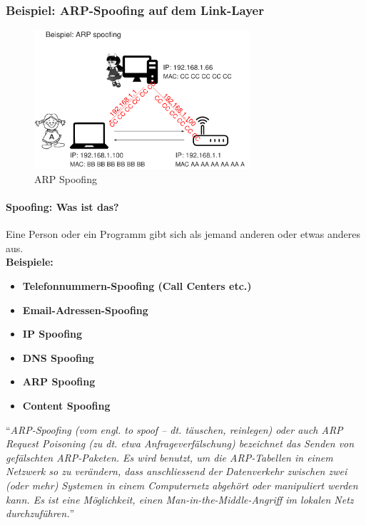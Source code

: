 \documentclass[10pt,a4paper]{article}
\begin{document}
\subsubsection*{Beispiel: ARP-Spoofing auf dem Link-Layer}
\begin{figure}[H]
    \begin{center}
    \includegraphics[width=8cm]{images/Beispiel_ARP_Spoofing.png}
    \caption{ARP Spoofing}
    \label{ARP Spoofing}
    \end{center}
\end{figure}

\paragraph*{Spoofing: Was ist das?}
Eine Person oder ein Programm gibt sich als jemand anderen oder etwas anderes aus.\\
\textbf{Beispiele:}
\begin{itemize}[noitemsep,topsep=0pt,leftmargin=*]
    \item \textbf{Telefonnummern-Spoofing (Call Centers etc.)}
    \item \textbf{Email-Adressen-Spoofing}
    \item \textbf{IP Spoofing}
    \item \textbf{DNS Spoofing}
    \item \textbf{ARP Spoofing}
    \item \textbf{Content Spoofing}
\end{itemize}
\vspace{0.5cm}
\noindent
"`\textsl{ARP-Spoofing (vom engl. to spoof – dt. täuschen, reinlegen) oder auch ARP Request Poisoning (zu dt. etwa Anfrageverfälschung) bezeichnet das Senden von gefälschten ARP-Paketen. Es wird benutzt, um die ARP-Tabellen in einem Netzwerk so zu verändern, dass anschliessend der Datenverkehr zwischen zwei (oder mehr) Systemen in einem Computernetz abgehört oder manipuliert werden kann. Es ist eine Möglichkeit, einen Man-in-the-Middle-Angriff im lokalen Netz durchzuführen.}"'\cite{wiki}
\end{document}
